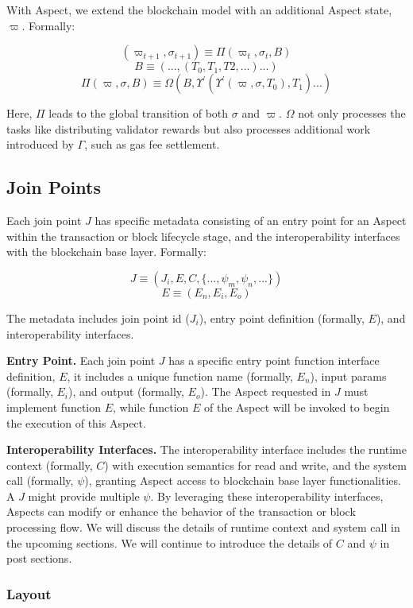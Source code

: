 With Aspect, we extend the blockchain model with an additional Aspect state, $\varpi$. Formally: 

$$
(\varpi_{t+1}, \sigma_{t+1}) \equiv\Pi(\varpi_{t}, \sigma_{t},B)
$$
$$
B \equiv (...,(T_0,T_1,T2,...)...)
$$
$$
\Pi(\varpi, \sigma,B)\equiv \Omega(B, \Upsilon^{'}(\Upsilon^{'}(\varpi, \sigma,T_0),T_1)...)
$$

Here, $\Pi$ leads to the global transition of both $\sigma$ and $\varpi$. $\Omega$  not only processes the tasks like distributing validator rewards but also processes additional work introduced by $\Gamma$, such as gas fee settlement.

\subsection{Join Points}

Each join point $J$ has specific metadata consisting of an entry point for an Aspect within the transaction or block lifecycle stage, and the interoperability interfaces with the blockchain base layer. Formally: 

$$
J \equiv(J_i, E,C,\{..., \psi_m,\psi_n,... \})
$$
$$
E \equiv (E_n, E_i, E_o)
$$

The metadata includes join point id ($J_i$), entry point definition (formally, $E$), and interoperability interfaces.

\textbf{Entry Point.} Each join point $J$ has a specific entry point function interface definition, $E$, it includes a unique function name (formally, $E_n$), input params (formally, $E_i$), and output (formally, $E_o$). The Aspect requested in $J$ must implement function $E$, while function $E$ of the Aspect will be invoked to begin the execution of this Aspect.

\textbf{Interoperability Interfaces.} The interoperability interface includes the runtime context (formally, $C$) with execution semantics for read and write, and the system call (formally, $\psi$), granting Aspect access to blockchain base layer functionalities. A $J$ might provide multiple $\psi$. By leveraging these interoperability interfaces, Aspects can modify or enhance the behavior of the transaction or block processing flow. We will discuss the details of runtime context and system call in the upcoming sections. We will continue to introduce the details of $C$ and $\psi$ in post sections.

\subsubsection{Layout}

